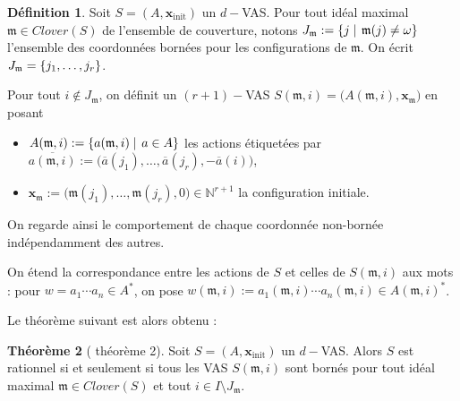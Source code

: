 \documentclass[a4paper,final]{article}
\theoremstyle{definition}
\newtheorem{Theorem}{Théorème}
\newtheorem{Definition}[Theorem]{Définition}
\newcommand{\set}[2]{\left\{#1\mathrel{\left|\vphantom{#1}\vphantom{#2}\right.}#2\right\}}
\newcommand{\os}[1]{\left\{\mathinner{#1}\right\}}
\newcommand{\N}{\ensuremath{\mathbb{N}}}
\newcommand{\clover}{\textit{Clover}}
\newcommand{\vect}[1]{\ensuremath{\mathbf{#1}}}
\newcommand{\xinit}{\ensuremath{\vect{x}_\text{init}}}
\newcommand{\valeur}[1]{\ensuremath{\overline{#1}}}
\begin{document}
\begin{Definition}
Soit $S=(A,\xinit)$ un $d-$VAS.
Pour tout idéal maximal $\mathfrak{m}\in\clover(S)$ de l'ensemble de couverture, notons $J_\mathfrak{m}:=\set{j}{\mathfrak{m}(j)\neq \omega}$ l'ensemble des coordonnées bornées pour les configurations de $\mathfrak{m}$.
On écrit $J_\mathfrak{m}=\os{j_1,\dots,j_r}$.

Pour tout $i\notin J_\mathfrak{m}$, on définit un $(r+1)-$VAS $S(\mathfrak{m},i) = \big(A(\mathfrak{m},i), \vect{x}_\mathfrak{m}\big)$ en posant
\begin{itemize}
    \item $A(\mathfrak{m},i) := \set{a(\mathfrak{m},i)} {a\in A}$ 
    les actions étiquetées par $\valeur{a(\mathfrak{m},i)} := \big(\valeur{a}(j_1), \dots, \valeur{a}(j_r), -\valeur{a}(i) \big)$,
    \item $\vect{x}_\mathfrak{m} := \big(\mathfrak{m}(j_1), \dots, \mathfrak{m}(j_r), 0\big) \in \N^{r+1}$ la configuration initiale.
\end{itemize}
\end{Definition}

\noindent On regarde ainsi le comportement de chaque coordonnée non-bornée indépendamment des autres.

On étend la correspondance entre les actions de $S$ et celles de $S(\mathfrak{m},i)$ aux mots : 
pour $w = a_1\cdots a_n \in A^\ast$, on pose $w(\mathfrak{m},i) := a_1(\mathfrak{m},i) \cdots a_n(\mathfrak{m},i) \in A(\mathfrak{m},i)^\ast$.

Le théorème suivant est alors obtenu :

\begin{Theorem}[\cite{giyo80} théorème 2]
    Soit $S=(A,\xinit)$ un $d-$VAS.
    Alors $S$ est rationnel si et seulement si 
    tous les VAS $S(\mathfrak{m},i)$ sont bornés pour tout idéal maximal $\mathfrak{m} \in \clover(S)$ et tout $i \in I \setminus J_\mathfrak{m}$.
\end{Theorem}
\end{document}
